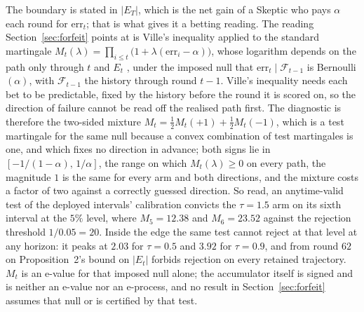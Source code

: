 The boundary is stated in $|E_T|$, which is the net gain of a Skeptic who pays $\alpha$ each round
for $\mathrm{err}_t$; that is what gives it a betting reading. The reading
Section~\ref{sec:forfeit} points at is Ville's inequality applied to the standard
martingale $M_t(\lambda) = \prod_{i \le t}\big(1 + \lambda(\mathrm{err}_i - \alpha)\big)$, whose
logarithm depends on the path only through $t$ and $E_t$
\citep{shafer2019gtfpf,ramdas2023savi,vovk2021evalues}, under the imposed null that
$\mathrm{err}_t \mid \mathcal{F}_{t-1}$ is Bernoulli$(\alpha)$, with $\mathcal{F}_{t-1}$ the
history through round $t-1$. Ville's inequality needs each bet to be predictable, fixed by the
history before the round it is scored on, so the direction of failure cannot be read off the
realised path first. The diagnostic is therefore
the two-sided mixture $M_t = \tfrac{1}{2}M_t(+1) + \tfrac{1}{2}M_t(-1)$, which is a test
martingale for the same null because a convex combination of test martingales is one, and which
fixes no direction in advance; both signs lie in $[-1/(1-\alpha),\,1/\alpha]$, the range on which
$M_t(\lambda) \ge 0$ on every path, the magnitude $1$ is the same for every arm and both
directions, and the mixture costs a factor of two against a correctly guessed direction. So read,
an anytime-valid test of the deployed intervals' calibration convicts the $\tau = 1.5$ arm on its
sixth interval at the $5\%$ level, where $M_5 = 12.38$ and $M_6 = 23.52$ against the rejection
threshold $1/0.05 = 20$. Inside the edge the same test cannot reject at that level at any horizon:
it peaks at $2.03$ for $\tau = 0.5$ and $3.92$ for $\tau = 0.9$, and from round $62$ on
Proposition~2's bound on $|E_t|$ forbids rejection on every retained trajectory. $M_t$ is an
e-value for that imposed null alone; the accumulator itself is signed and is neither an e-value
nor an e-process, and no result in Section~\ref{sec:forfeit} assumes that null or is certified by
that test.


